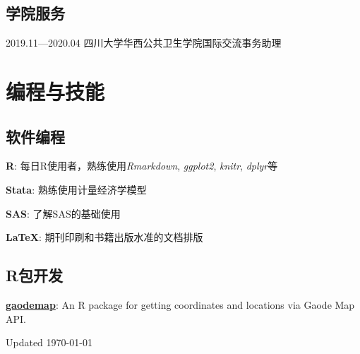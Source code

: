 \documentclass[12pt,letterpaper]{report}
\newcommand{\listitemspace}{0.15em}
\renewenvironment{itemize}
{\begin{list}{}{\setlength{\leftmargin}{0em}
            \setlength{\parskip}{0em}
            \setlength{\itemsep}{\listitemspace}
            \setlength{\parsep}{\listitemspace}}}
    {\end{list}}
\begin{document}
    \subsection*{学院服务}

    \begin{tablist}
    	
    	\item[2019.11—2020.04]  \tab 四川大学华西公共卫生学院国际交流事务助理
    
    \end{tablist}
	


    \section*{编程与技能}

    \subsection*{软件编程}

    \begin{itemize}

        \item \textbf{R}: 每日R使用者，熟练使用\textit{Rmarkdown}, \textit{ggplot2}, \textit{knitr}, \textit{dplyr}等
        \item \textbf{Stata}: 熟练使用计量经济学模型
        \item \textbf{SAS}: 了解SAS的基础使用
        \item \textbf{\LaTeX}: 期刊印刷和书籍出版水准的文档排版

    \end{itemize}

    \subsection*{R包开发}
    \begin{itemize}

 	\item \href{https://github.com/xiaojunlin/gaodemap}{\textbf{gaodemap}}: An R package for getting coordinates and locations via Gaode Map API. 

    \end{itemize}

    \begin{center}
        \vfill
        Updated \monthyeardate\today
    \end{center}
\end{document}
